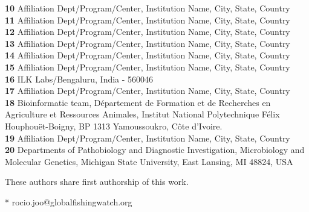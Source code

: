 \documentclass[10pt,letterpaper]{article}
\begin{document}
\begin{flushleft}
\textbf{10} Affiliation Dept/Program/Center, Institution Name, City, State, Country
\\
\textbf{11} Affiliation Dept/Program/Center, Institution Name, City, State, Country
\\
\textbf{12} Affiliation Dept/Program/Center, Institution Name, City, State, Country
\\
\textbf{13} Affiliation Dept/Program/Center, Institution Name, City, State, Country
\\
\textbf{14} Affiliation Dept/Program/Center, Institution Name, City, State, Country
\\
\textbf{15} Affiliation Dept/Program/Center, Institution Name, City, State, Country
\\
\textbf{16} ILK Labs/Bengaluru, India - 560046
\\
\textbf{17} Affiliation Dept/Program/Center, Institution Name, City, State, Country
\\
\textbf{18} Bioinformatic team, Département de Formation et de Recherches en Agriculture et Ressources Animales, Institut National Polytechnique Félix Houphouët-Boigny, BP 1313 Yamoussoukro, Côte d’Ivoire.
\\
\textbf{19} Affiliation Dept/Program/Center, Institution Name, City, State, Country
\\
\textbf{20} Departments of Pathobiology and Diagnostic Investigation, Microbiology and Molecular Genetics, Michigan State University, East Lansing, MI 48824, USA
\\
\bigskip

% 
%
\Yinyang These authors share first authorship of this work.




* rocio.joo@globalfishingwatch.org

\end{flushleft}
\end{document}
